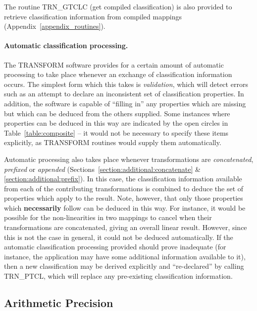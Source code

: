 \documentclass[twoside,11pt]{article}
\newcommand{\xlabel}[1]{}
\newcommand{\name}[1]{\mbox{\small{#1}}}
\begin{document}
The routine \name{TRN\_GTCLC} (get compiled classification) is also provided
to retrieve classification information from compiled mappings
(Appendix~\ref{appendix_routines}). 

\paragraph{Automatic classification processing.}
The \name{TRANSFORM} software provides for a certain amount of automatic
processing to take place whenever an exchange of classification information
occurs. 
The simplest form which this takes is \emph{validation}, which will detect
errors such as an attempt to declare an inconsistent set of classification
properties. 
In addition, the software is capable of ``filling in'' any properties which
are missing but which can be deduced from the others supplied. 
Some instances where properties can be deduced in this way are indicated by
the open circles in Table~\ref{table:composite} -- it would not be
necessary to specify these items explicitly, as \name{TRANSFORM} routines
would supply them automatically. 

Automatic processing also takes place whenever transformations are
\emph{concatenated}, \emph{prefixed} or \emph{appended}
(Sections~\ref{section:additional:concatenate} \& 
\ref{section:additional:prefix}). 
In this case, the classification information available from each of the
contributing transformations is combined to deduce the set of
properties which apply to the result. 
Note, however, that only those properties which \textbf{necessarily} follow can
be deduced in this way.
For instance, it would be possible for the non-linearities in two mappings
to cancel when their transformations are concatenated, giving an overall
linear result. 
However, since this is not the case in general, it could not be deduced
automatically. 
If the automatic classification processing provided should prove inadequate
(for instance, the application may have some additional information
available to it), then a new classification may be derived explicitly and
``re-declared'' by calling \name{TRN\_PTCL}, which will replace any
pre-existing classification information. 


\subsection{\xlabel{arithmetic_precision}Arithmetic Precision} 

\label{section:advanced:precision}
\end{document}
